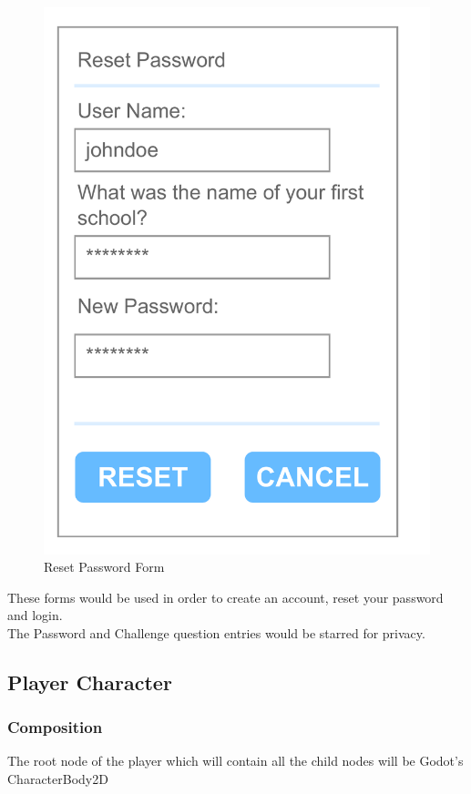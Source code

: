 \documentclass{article}
\begin{document}
\begin{multicols}{3}
\begin{figure}[H]
                        \includegraphics[width = 0.9\columnwidth]{images/design/Reset_Password.pdf}
                        \caption{Reset Password Form}
                        \label{fig:ie_3}
                \end{figure}
        \end{multicols}\[\]
        These forms would be used in order to create an account, reset your password and login.\\
        The Password and Challenge question entries would be starred for privacy.\\
        \subsection{Player Character}
        \subsubsection{Composition}
        
        The root node of the player which will contain all the child nodes will be Godot's CharacterBody2D
\end{document}
